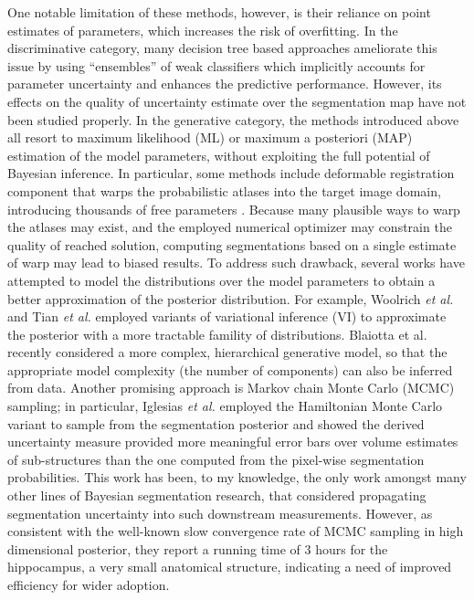 One notable limitation of these methods, however, is their reliance on point estimates of parameters, which increases the risk of overfitting. In the discriminative category, many decision tree based approaches ameliorate this issue by using ``ensembles'' of weak classifiers \cite{iglesias2011combining,criminisi2011discriminative,criminisi2009decision,montillo2011entangled,le2016lifted} which implicitly accounts for parameter uncertainty and enhances the predictive performance. However, its effects on the quality of uncertainty estimate over the segmentation map have not been studied properly. In the generative category, the methods introduced above all resort to maximum likelihood (ML) or maximum a posteriori (MAP) estimation of the model parameters, without exploiting the full potential of Bayesian inference. In particular, some methods include deformable registration component that warps the probabilistic atlases into the target image domain, introducing thousands of free parameters \cite{pohl2006bayesian,ashburner2005unified,van2009automated,sabuncu2010generative,cardoso2011load}. Because many plausible ways to warp the atlases may exist, and the employed numerical optimizer may constrain the quality of reached solution, computing segmentations based on a single estimate of warp may lead to biased results. To address such drawback, several works have attempted to model the distributions over the model parameters to obtain a better approximation of the posterior distribution. For example, Woolrich \textit{et al.} \cite{woolrich2006variational} and Tian \textit{et al.} \cite{tian2011hybrid} employed variants of variational inference (VI) to approximate the posterior with a more tractable famility of distributions. Blaiotta et al. \cite{blaiotta2016variational} recently considered a more complex, hierarchical generative model, so that the appropriate model complexity (the number of components) can also be inferred from data. Another promising approach is Markov chain Monte Carlo (MCMC) sampling; in particular, Iglesias \textit{et al.} \cite{iglesias2012incorporating,iglesias2013improved} employed the Hamiltonian Monte Carlo variant to sample from the segmentation posterior and showed the derived uncertainty measure provided more meaningful error bars over volume estimates of sub-structures than the one computed from the pixel-wise segmentation probabilities. This work has been, to my knowledge, the only work amongst many other lines of Bayesian segmentation research, that considered propagating segmentation uncertainty into such downstream measurements. However, as consistent with the well-known slow convergence rate of MCMC sampling in high dimensional posterior, they report a running time of $3$ hours for the hippocampus, a very small anatomical structure, indicating a need of improved efficiency for wider adoption. 




